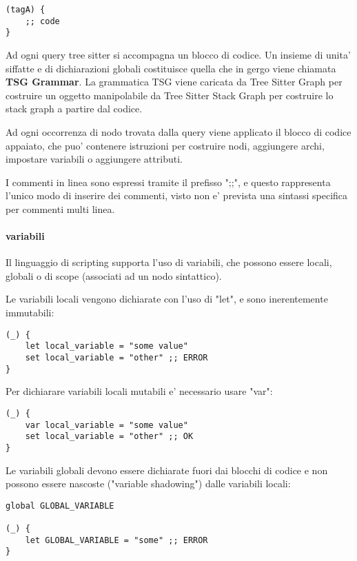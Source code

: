 \begin{verbatim}
(tagA) {
    ;; code
}
\end{verbatim}

Ad ogni query tree sitter si accompagna un blocco di codice.
Un insieme di unita' siffatte e di dichiarazioni globali costituisce quella che in gergo viene chiamata \textbf{TSG Grammar}. La grammatica TSG viene caricata da Tree Sitter Graph per costruire un oggetto manipolabile da Tree Sitter Stack Graph per costruire lo stack graph a partire dal codice.

Ad ogni occorrenza di nodo trovata dalla query viene applicato il blocco di codice appaiato, che puo' contenere istruzioni per costruire nodi, aggiungere archi, impostare variabili o aggiungere attributi.

I commenti in linea sono espressi tramite il prefisso ";;", e questo rappresenta l'unico modo di inserire dei commenti, visto non e' prevista una sintassi specifica per commenti multi linea.

\paragraph{variabili}
Il linguaggio di scripting supporta l'uso di variabili, che possono essere locali, globali o di scope (associati ad un nodo sintattico).

Le variabili locali vengono dichiarate con l'uso di "let", e sono inerentemente immutabili:

\begin{verbatim}
(_) {
    let local_variable = "some value"
    set local_variable = "other" ;; ERROR
}
\end{verbatim}

Per dichiarare variabili locali mutabili e' necessario usare "var":

\begin{verbatim}
(_) {
    var local_variable = "some value"
    set local_variable = "other" ;; OK
}
\end{verbatim}

Le variabili globali devono essere dichiarate fuori dai blocchi di codice e non possono essere nascoste ("variable shadowing") dalle variabili locali:

\begin{verbatim}
global GLOBAL_VARIABLE

(_) {
    let GLOBAL_VARIABLE = "some" ;; ERROR
}
\end{verbatim}

